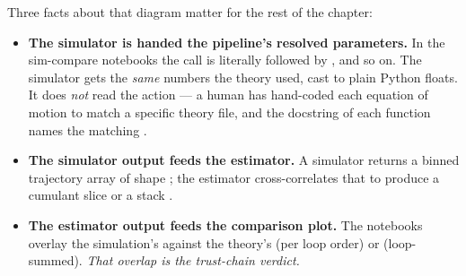 \begin{center}
\end{center}

Three facts about that diagram matter for the rest of the chapter:

\begin{itemize}
  \item \textbf{The simulator is handed the pipeline's resolved parameters.} In
        the sim-compare notebooks the call is literally
         followed by
        , and so on. The simulator gets the
        \emph{same} numbers the theory used, cast to plain Python floats. It does
        \emph{not} read the action --- a human has hand-coded each equation of
        motion to match a specific theory file, and the docstring of each
         function names the matching .
  \item \textbf{The simulator output feeds the estimator.} A simulator returns a
        binned trajectory array of shape ; the estimator
        cross-correlates that to produce a cumulant slice  or a
        stack .
  \item \textbf{The estimator output feeds the comparison plot.} The notebooks
        overlay the simulation's  against the theory's
         (per loop order) or 
        (loop-summed). \emph{That overlap is the trust-chain verdict.}
\end{itemize}

